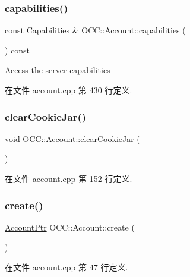 \subsubsection{\texorpdfstring{capabilities()}{capabilities()}}
{\footnotesize\ttfamily const \hyperlink{class_o_c_c_1_1_capabilities}{Capabilities} \& O\+C\+C\+::\+Account\+::capabilities (\begin{DoxyParamCaption}{ }\end{DoxyParamCaption}) const}

Access the server capabilities 

在文件 account.\+cpp 第 430 行定义.

\mbox{\label{class_o_c_c_1_1_account_a76bbbb50a9d4ffc998857a7ab982999f}} 
\subsubsection{\texorpdfstring{clear\+Cookie\+Jar()}{clearCookieJar()}}
{\footnotesize\ttfamily void O\+C\+C\+::\+Account\+::clear\+Cookie\+Jar (\begin{DoxyParamCaption}{ }\end{DoxyParamCaption})}



在文件 account.\+cpp 第 152 行定义.

\mbox{\label{class_o_c_c_1_1_account_a61ead0e7524c24748cc58d248dd8085e}} 
\subsubsection{\texorpdfstring{create()}{create()}}
{\footnotesize\ttfamily \hyperlink{namespace_o_c_c_a848616aedb9188e223c6b9867757fe69}{Account\+Ptr} O\+C\+C\+::\+Account\+::create (\begin{DoxyParamCaption}{ }\end{DoxyParamCaption})\hspace{0.3cm}{\ttfamily [static]}}



在文件 account.\+cpp 第 47 行定义.

\mbox{\label{class_o_c_c_1_1_account_aead250da94c2a743e702268f60a6e781}} 
